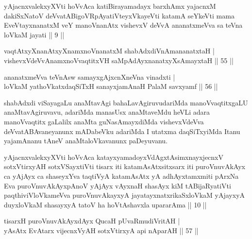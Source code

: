 
\begin{kandikeshl}
yAjacnxvalekxyXVti hoVvAca katiBirayamadayx barxhAmx yajacnxM dakiSxNatoV deVvatABigoVRpAyatiVteyxVkayeVti katamA seYkeVti mama EveVtayxnanatxM veY manoV\s nanAtx vishevxV deVvA ananatxmeVva sa teVna loVkaM jayati || 9 ||
\end{kandikeshl}


\begin{shl}
vaqtAtxyXnanAtxyXnamxnoV\s nanatxM shabAdxdiVnAmananatxtaH |\\
vishevxVdeVvAnamxnoVvaqtitxVH saMpAdAyx\s \s nanatxyXsAmayxtaH \hfill || 55 || 
\end{shl}

\begin{shl}
ananatxmeVva teVnAsw samayxgAjxcnXneVna vinadxti |\\
loVkaM yathoVkatxdaqSiTxH sanayxjamAnaH PalaM savxyamf \hfill || 56 ||
\end{shl}

\begin{artha}
shabAdxdi viSayagaLu anaMtavAgi bahaLavAgiruvudariMda manoVvaqtitxgaLU anaMtavAgiruvavu, adariMda manasUsx anaMtaveMdu heVLi adara manoVvaqtitx	gaLalilx anaMta guNasAmayxdiMda vishevxVdeVva deVvatABAvaneyanunx mADabeVku adariMda I utatxma daqSiTxyiMda Itanu yajamAnanu tAneV anaMtaloVkavanunx paDeyuvanu.
\end{artha}


\begin{kandikeshl}
yAjacnxvalekxyXVti hoVvAca katayxyamadoyxVdAgxtAsimxnayxjecnxV sotxVtirxyAH sotxVSayxtiVti tisarx iti katamAsAtxsitxsarx iti puroVnuvAkAyx ca yAjAyx ca shaseyxYva taqtiVyA katamAsAtx yA adhAyxtamxmiti pArxNa Eva puroVnuvAkAyxpAnoV yAjAyx vAyxnaH shasAyx kiM tABijaRyatiVti paqthiviVloVkameVva puroVnuvAkayxyA jayatayxnatxrikaSxloVkaM yAjayxyA duyxloVkaM shasayxyA tatoV ha hoVtAshavxla upararAma || 10 ||
\end{kandikeshl}


\begin{shl}
tisarxH puroVnuvAkAyxdAyx QucaH pUvaRmudiVritAH |\\
yAsAtx EvAtarx vijecnxVyAH sotxVtirxyA api nAparAH \hfill || 57 ||
\end{shl}

